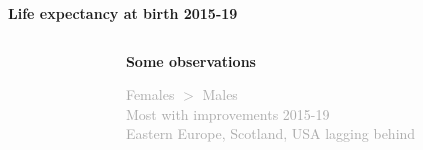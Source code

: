 \documentclass[xcolor={dvipsnames}]{beamer}
\begin{document}
\begin{frame}

\begin{center}
 \LARGE{\textbf{Life expectancy at birth 2015-19}}
\end{center}

\begin{columns}

\begin{column}{0.65\textwidth}
\vspace*{-.8cm}

\end{column}

\pause

\begin{column}{0.35\textwidth}
\vspace*{-.8cm}

\Large{

\begin{center}\textbf{Some observations}\\
\end{center}
\textcolor{darkgray}{
Females $>$ Males  \linebreak \\
Most with improvements 2015-19 \linebreak \\
Eastern Europe, Scotland, USA lagging behind 
}
}
\end{column}
\end{columns}  
\end{frame}
\end{document}
